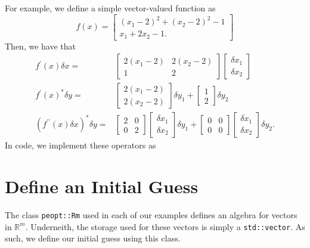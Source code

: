 \documentclass{report}
\newcommand{\re}{\mathbb{R}}
\begin{document}
        For example, we define a simple vector-valued function as
$$
    f(x)=\begin{bmatrix}
        (x_1-2)^2 + (x_2-2)^2 - 1\\
        x_1 + 2x_2 - 1.
    \end{bmatrix}
$$
Then, we have that
\begin{align*}
    f^\prime(x)\delta x=&\begin{bmatrix}
        2(x_1-2) & 2(x_2-2)\\
        1 & 2
    \end{bmatrix}\begin{bmatrix}\delta x_1\\\delta x_2\end{bmatrix}\\
    f^\prime(x)^*\delta y=&
        \begin{bmatrix}
            2(x_1-2)\\
            2(x_2-2)
        \end{bmatrix}  \delta y_1
        +
        \begin{bmatrix}
            1\\
            2
        \end{bmatrix} \delta y_2\\
    (f^{\prime\prime}(x)\delta x)^*\delta y=&
        \begin{bmatrix}
            2 & 0\\
            0 & 2
        \end{bmatrix}\begin{bmatrix}\delta x_1\\\delta x_2\end{bmatrix}
            \delta y_1
        +\begin{bmatrix}
            0 & 0\\
            0 & 0
        \end{bmatrix}\begin{bmatrix}\delta x_1\\\delta x_2\end{bmatrix}
            \delta y_2.
\end{align*}
In code, we implement these operators as


\section{Define an Initial Guess} 

        The class \texttt{peopt::Rm} used in each of our examples defines an algebra for vectors in $\re^m$.  Underneith, the storage used for these vectors is simply a \texttt{std::vector}.  As such, we define our initial guess using this class.
\end{document}
